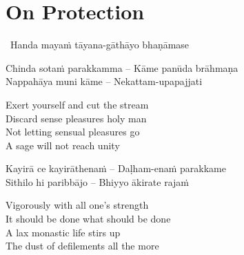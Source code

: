 
\section{On Protection}
\label{protection}

\begin{leader}
  \anglebracketleft\ \hspace{-0.5mm}Handa mayaṁ tāyana-gāthāyo bhaṇāmase \hspace{-0.5mm}\anglebracketright\
\end{leader}

\begin{verses}
  Chinda sotaṁ parakkamma – Kāme panūda brāhmaṇa\\
  Nappahāya muni kāme – Nekattam-upapajjati
\end{verses}

\begin{english-verses}
  Exert yourself and cut the stream\\
  Discard sense pleasures holy man\\
  Not letting sensual pleasures go\\
  A sage will not reach unity\hyperlink{endnote40-appendix}{\hypertarget{endnote40-body}{}}
\end{english-verses}

\begin{verses}
  Kayirā ce kayirāthenaṁ – Daḷham-enaṁ parakkame\\
  Sithilo hi paribbājo – Bhiyyo ākirate rajaṁ
\end{verses}

\begin{english-verses}
  Vigorously with all one's strength\\
  It should be done what should be done\\
  A lax monastic life stirs up\\
  The dust of defilements all the more\hyperlink{endnote41-appendix}{\hypertarget{endnote41-body}{}}
\end{english-verses}

